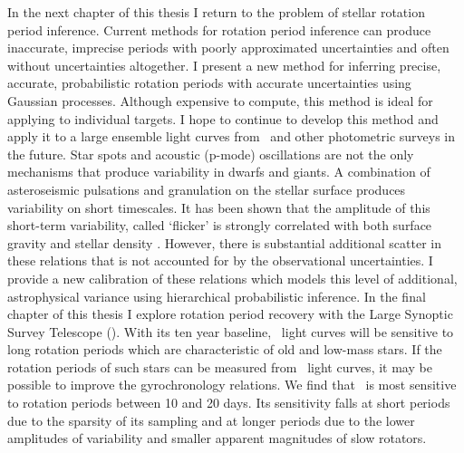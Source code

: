 In the next chapter of this thesis I return to the problem of stellar rotation
period inference.
Current methods for rotation period inference can produce inaccurate,
imprecise periods with poorly approximated uncertainties and often without
uncertainties altogether.
I present a new method for inferring precise, accurate, probabilistic rotation
periods with accurate uncertainties using Gaussian processes.
Although expensive to compute, this method is ideal for applying to individual
targets.
I hope to continue to develop this method and apply it to a large ensemble
light curves from \kepler\ and other photometric surveys in the future.
Star spots and acoustic (p-mode) oscillations are not the only mechanisms
that produce variability in dwarfs and giants.
A combination of asteroseismic pulsations and granulation on the stellar
surface produces variability on short timescales.
It has been shown that the amplitude of this short-term variability, called
`flicker' is strongly correlated with both surface gravity and stellar
density \citep{Bastien2013, Bastien2016, Kipping2014}.
However, there is substantial additional scatter in these relations that is
not accounted for by the observational uncertainties.
I provide a new calibration of these relations which models this level of
additional, astrophysical variance using hierarchical probabilistic inference.
In the final chapter of this thesis I explore rotation period recovery with
the Large Synoptic Survey Telescope (\LSST).
With its ten year baseline, \LSST\ light curves will be sensitive to long
rotation periods which are characteristic of old and low-mass stars.
If the rotation periods of such stars can be measured from \LSST\ light
curves, it may be possible to improve the gyrochronology relations.
We find that \LSST\ is most sensitive to rotation periods between 10 and 20
days.
Its sensitivity falls at short periods due to the sparsity of its sampling and
at longer periods due to the lower amplitudes of variability and smaller
apparent magnitudes of slow rotators.
